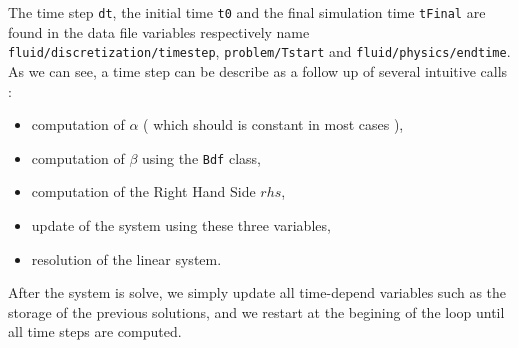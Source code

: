 The time step \verb!dt!, the initial time \verb!t0! and the final simulation time \verb!tFinal!
are found in the data file variables respectively name \verb!fluid/discretization/timestep!,
\verb!problem/Tstart! and \verb!fluid/physics/endtime!. As we can see, a time step can be describe
as a follow up of several intuitive calls :
\begin{itemize}
\item computation of $\alpha$ ( which should is constant in most cases ),
\item computation of $\beta$ using the \verb!Bdf! class,
\item computation of the Right Hand Side $rhs$,
\item update of the system using these three variables,
\item resolution of the linear system.
\end{itemize}
After the system is solve, we simply update all time-depend variables such as the storage
of the previous solutions, and we restart at the begining of the loop until all time steps are computed.


%
%
